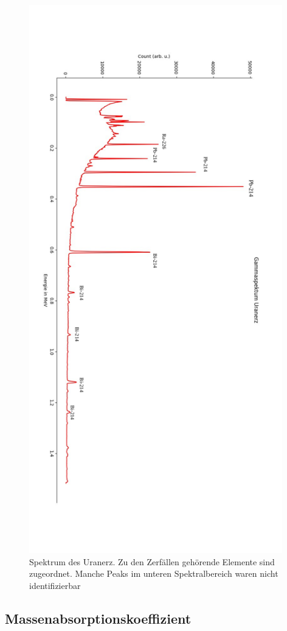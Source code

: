 \begin{figure}[h]
    \centering
    \includegraphics[width = 11cm]{Bilder/Auswertung/UranerzSpektrum.pdf}
    \caption{Spektrum des Uranerz. Zu den Zerfällen gehörende Elemente sind zugeordnet. Manche Peaks im unteren Spektralbereich waren nicht identifizierbar}
    \label{Uranerz}
\end{figure}

\clearpage
\subsection{Massenabsorptionskoeffizient}

